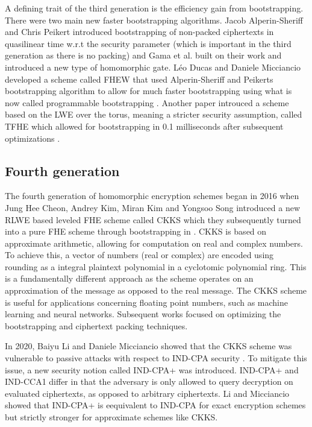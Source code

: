 A defining trait of the third generation is the efficiency gain from bootstrapping. There were two main new faster bootstrapping algorithms. Jacob Alperin-Sheriff and Chris Peikert \cite{A-S-P-boot} introduced bootstrapping of non-packed ciphertexts in quasilinear time w.r.t the security parameter (which is important in the third generation as there is no packing) and Gama et al. \cite{Gama-boot} built on their work and introduced a new type of homomorphic gate. Léo Ducas and Daniele Micciancio developed a scheme called FHEW that used Alperin-Sheriff and Peikerts bootstrapping algorithm to allow for much faster bootstrapping using what is now called programmable bootstrapping \cite{FHEW}. Another paper introuced a scheme based on the LWE over the torus, meaning a stricter security assumption, called TFHE \cite{TFHE} which allowed for bootstrapping in 0.1 milliseconds after subsequent optimizations \cite{MP-fhew-tfhe}.

\subsection*{Fourth generation}
The fourth generation of homomorphic encryption schemes began in 2016 when Jung Hee Cheon, Andrey Kim, Miran Kim and Yongsoo Song introduced a new RLWE based leveled FHE scheme called CKKS \cite{CKKS16} which they subsequently turned into a pure FHE scheme through bootstrapping in \cite{CKKS-boot}. CKKS is based on approximate arithmetic, allowing for computation on real and complex numbers. To achieve this, a vector of numbers (real or complex) are encoded using rounding as a integral plaintext polynomial in a cyclotomic polynomial ring. This is a fundamentally different approach as the scheme operates on an approximation of the message as opposed to the real message. The CKKS scheme is useful for applications concerning floating point numbers, such as machine learning and neural networks. Subsequent works focused on optimizing the bootstrapping and ciphertext packing techniques.

In 2020, Baiyu Li and Daniele Micciancio showed that the CKKS scheme was vulnerable to passive attacks with respect to IND-CPA security \cite{CKKS-attack}. To mitigate this issue, a new security notion called IND-CPA+ was introduced. IND-CPA+ and IND-CCA1 differ in that the adversary is only allowed to query decryption on evaluated ciphertexts, as opposed to arbitrary ciphertexts. Li and Micciancio showed that IND-CPA+ is eequivalent to IND-CPA for exact encryption schemes but strictly stronger for approximate schemes like CKKS. 

